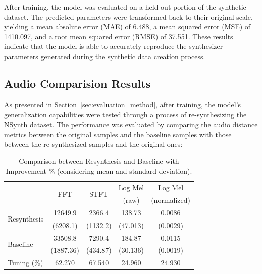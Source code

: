 \documentclass[10pt,conference]{IEEEtran}
\begin{document}
After training, the model was evaluated on a held-out portion of the synthetic dataset. The predicted parameters were transformed back to their original scale, yielding a mean absolute error (MAE) of 6.488, a mean squared error (MSE) of 1410.097, and a root mean squared error (RMSE) of 37.551. These results indicate that the model is able to accurately reproduce the synthesizer parameters generated during the synthetic data creation process.


\subsection{Audio Comparision Results}

As presented in Section~\ref{sec:evaluation_method}, after training, the model’s generalization capabilities were tested through a process of re-synthesizing the NSynth dataset. The performance was evaluated by comparing the audio distance metrics between the original samples and the baseline samples with those between the re-synthesized samples and the original ones:


\begin{table}[htb] \small %
  \caption{Comparison between Resynthesis and Baseline with Improvement \% (considering mean and standard deviation).}
  \label{tab:metrics}
\begin{tabular*}{\columnwidth}
	{@{\extracolsep{\fill}}lcccc}
        \toprule
        & \multirow{2}{*}{FFT} & \multirow{2}{*}{STFT} & Log Mel & Log Mel \\ 
        & & & (raw) & (normalized) \\
        
        \midrule
        \multirow{2}{*}{Resynthesis} & 12649.9 & 2366.4 & 138.73 & 0.0086 \\
        & (6208.1) & (1132.2) & (47.013) & (0.0029) \\ 
        \multirow{2}{*}{Baseline} & 33508.8 & 7290.4 & 184.87 & 0.0115 \\
        & (1887.36) & (434.87) & (30.136) & (0.0019) \\
        \midrule
        Tuning (\%) & 62.270 & 67.540 & 24.960 & 24.930 \\
        \bottomrule
    \end{tabular*}
    \label{tab:metrics}
\end{table}
\end{document}
